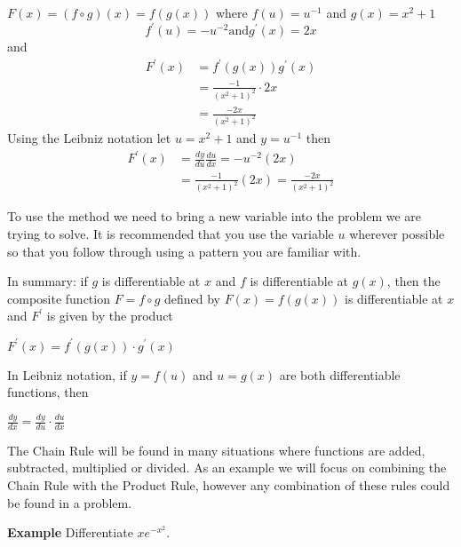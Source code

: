 $F (x) =\left (f \circ g\right ) (x) =f (g (x))$ where $f (u) =u^{ -1}$ and $g (x) =x^{2} +1$
\begin{equation*}f^{ \prime } (u) = -u^{ -2}\text{and}g^{ \prime } (x) =2 x
\end{equation*}
and 
\begin{align*}F^{ \prime } (x) &  = f^{ \prime } (g (x)) g^{ \prime } (x) \\
 &  = \frac{ -1}{(x^{2} +1)^{2}} \cdot 2 x \\
 &  = \frac{ -2 x}{\left (x^{2} +1\right )^{2}}\end{align*}
Using the Leibniz notation let $u =x^{2} +1$ and $y =u^{ -1}$ then
\begin{align*}F^{ \prime } (x) &  = \frac{d y}{d u} \frac{d u}{d x} = -u^{ -2} \left (2 x\right ) \\
 &  = \frac{ -1}{\left (x^{2} +1\right )^{2}} \left (2 x\right ) =\frac{ -2 x}{\left (x^{2} +1\right )^{2}}\end{align*}

To use the method we need to bring a new variable into the problem we are trying to solve. It
is recommended that you use the variable $u$ wherever possible so that you follow through using a pattern you are familiar with. 

In summary: if $g$ is differentiable at $x$ and $f$ is differentiable at $g (x)$, then the composite function $F =f \circ g$ defined by $F (x) =f (g (x))$ is differentiable at $x$ and $F^{ \prime }$ is given by the product
\begin{tcolorbox}
	\begin{center}
		$F^{ \prime } (x) =f^{ \prime } (g (x)) \cdot g^{ \prime } (x)$
	\end{center}
\end{tcolorbox}
In Leibniz notation, if $y =f (u)$ and $u =g (x)$ are both differentiable functions, then
\begin{tcolorbox}
	\begin{center}
$\frac{d y}{d x} =\frac{d y}{d u} \cdot \frac{d u}{d x}$
	\end{center}
\end{tcolorbox}

The Chain Rule will be found in many situations where functions are added, subtracted, multiplied or divided. As an example we will focus on combining the Chain Rule with the Product Rule, however any combination of these rules could be found in a problem. 

\textbf{Example} Differentiate $x e^{ -x^{2}}$. 

